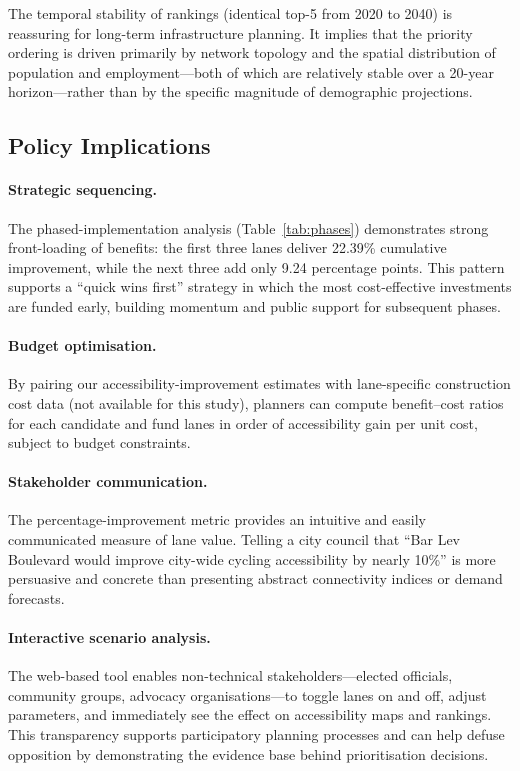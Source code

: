 \documentclass[12pt,a4paper]{article}
\begin{document}
The temporal stability of rankings (identical top-5 from 2020 to 2040) is reassuring for long-term infrastructure planning. It implies that the priority ordering is driven primarily by network topology and the spatial distribution of population and employment---both of which are relatively stable over a 20-year horizon---rather than by the specific magnitude of demographic projections.

\subsection{Policy Implications}

\paragraph{Strategic sequencing.}
The phased-implementation analysis (Table~\ref{tab:phases}) demonstrates strong front-loading of benefits: the first three lanes deliver 22.39\% cumulative improvement, while the next three add only 9.24 percentage points. This pattern supports a ``quick wins first'' strategy in which the most cost-effective investments are funded early, building momentum and public support for subsequent phases.

\paragraph{Budget optimisation.}
By pairing our accessibility-improvement estimates with lane-specific construction cost data (not available for this study), planners can compute benefit--cost ratios for each candidate and fund lanes in order of accessibility gain per unit cost, subject to budget constraints.

\paragraph{Stakeholder communication.}
The percentage-improvement metric provides an intuitive and easily communicated measure of lane value. Telling a city council that ``Bar Lev Boulevard would improve city-wide cycling accessibility by nearly 10\%'' is more persuasive and concrete than presenting abstract connectivity indices or demand forecasts.

\paragraph{Interactive scenario analysis.}
The web-based tool enables non-technical stakeholders---elected officials, community groups, advocacy organisations---to toggle lanes on and off, adjust parameters, and immediately see the effect on accessibility maps and rankings. This transparency supports participatory planning processes and can help defuse opposition by demonstrating the evidence base behind prioritisation decisions.
\end{document}
